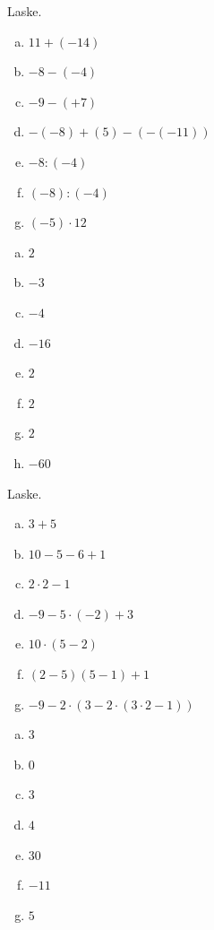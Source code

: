     \begin{tehtava}
    Laske.
    \begin{enumerate}[a)]
        \item $11+(-14)$
        \item $-8-(-4)$
        \item $-9-(+7)$
        \item $-(-8)+(5)-(-(-11))$
        \item $-8:(-4)$
        \item $(-8):(-4)$
        \item $(-5)\cdot 12$
    \end{enumerate}
        \begin{vastaus}
        \begin{enumerate}[a)]
            \item $2$
            \item $-3$
            \item $-4$
            \item $-16$
            \item $2$
            \item $2$
            \item $2$
            \item $-60$
        \end{enumerate}
        \end{vastaus}
    \end{tehtava}

    \begin{tehtava}
        Laske.
        \begin{enumerate}[a)]
            \item $3+5$
            \item $10-5-6+1$
            \item $2 \cdot 2 - 1$
            \item $-9 - 5 \cdot (-2) + 3$
            \item $10 \cdot (5 - 2)$
            \item $(2-5)(5 - 1) + 1$
            \item $-9 - 2 \cdot ( 3 - 2 \cdot (3\cdot2 - 1))$
        \end{enumerate}

        \begin{vastaus}
            \begin{enumerate}[a)]
                \item $3$
                \item $0$
                \item $3$
                \item $4$
                \item $30$
                \item $-11$
                \item $5$
            \end{enumerate}
        \end{vastaus}
    \end{tehtava}

